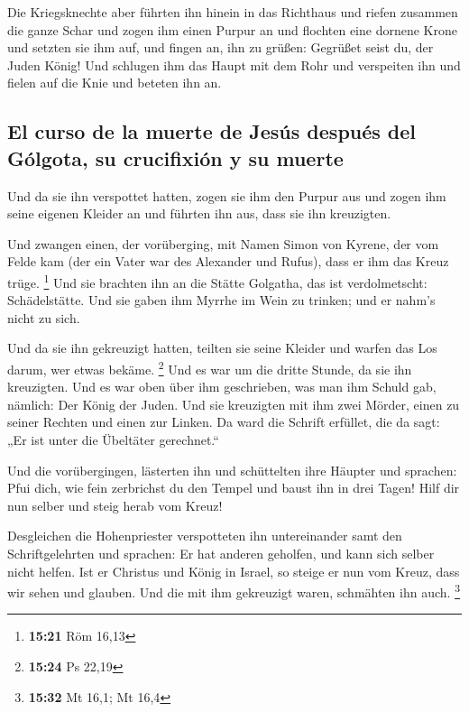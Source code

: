  Die Kriegsknechte aber führten ihn hinein in das
Richthaus und riefen zusammen die ganze Schar  und zogen
ihm einen Purpur an und flochten eine dornene Krone und setzten sie ihm
auf,  und fingen an, ihn zu grüßen: Gegrüßet seist du,
der Juden König!  Und schlugen ihm das Haupt mit dem Rohr
und verspeiten ihn und fielen auf die Knie und beteten ihn an.

\hypertarget{el-curso-de-la-muerte-de-jesuxfas-despuuxe9s-del-guxf3lgota-su-crucifixiuxf3n-y-su-muerte}{%
\subsection{El curso de la muerte de Jesús después del Gólgota, su
crucifixión y su
muerte}\label{el-curso-de-la-muerte-de-jesuxfas-despuuxe9s-del-guxf3lgota-su-crucifixiuxf3n-y-su-muerte}}

 Und da sie ihn verspottet hatten, zogen sie ihm den
Purpur aus und zogen ihm seine eigenen Kleider an und führten ihn aus,
dass sie ihn kreuzigten.

 Und zwangen einen, der vorüberging, mit Namen Simon von
Kyrene, der vom Felde kam (der ein Vater war des Alexander und Rufus),
dass er ihm das Kreuz trüge. \footnote{\textbf{15:21} Röm 16,13}
 Und sie brachten ihn an die Stätte Golgatha, das ist
verdolmetscht: Schädelstätte.  Und sie gaben ihm Myrrhe
im Wein zu trinken; und er nahm's nicht zu sich.

 Und da sie ihn gekreuzigt hatten, teilten sie seine
Kleider und warfen das Los darum, wer etwas bekäme. \footnote{\textbf{15:24}
  Ps 22,19}  Und es war um die dritte Stunde, da sie ihn
kreuzigten.  Und es war oben über ihm geschrieben, was
man ihm Schuld gab, nämlich: Der König der Juden.  Und
sie kreuzigten mit ihm zwei Mörder, einen zu seiner Rechten und einen
zur Linken.  Da ward die Schrift erfüllet, die da sagt:
„Er ist unter die Übeltäter gerechnet.``

 Und die vorübergingen, lästerten ihn und schüttelten
ihre Häupter und sprachen: Pfui dich, wie fein zerbrichst du den Tempel
und baust ihn in drei Tagen!  Hilf dir nun selber und
steig herab vom Kreuz!

 Desgleichen die Hohenpriester verspotteten ihn
untereinander samt den Schriftgelehrten und sprachen: Er hat anderen
geholfen, und kann sich selber nicht helfen.  Ist er
Christus und König in Israel, so steige er nun vom Kreuz, dass wir sehen
und glauben. Und die mit ihm gekreuzigt waren, schmähten ihn auch.
\footnote{\textbf{15:32} Mt 16,1; Mt 16,4}


